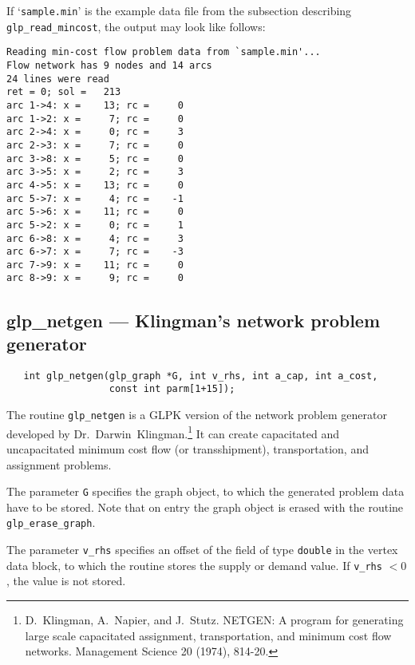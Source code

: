 \documentclass[11pt]{report}
\def\para#1{\noindent{\bf#1}}
\def\synopsis{\para{Synopsis}}
\def\description{\para{Description}}
\begin{document}
If `\verb|sample.min|' is the example data file from the subsection
describing \verb|glp_read_mincost|, the output may look like follows:

\begin{footnotesize}
\begin{verbatim}
Reading min-cost flow problem data from `sample.min'...
Flow network has 9 nodes and 14 arcs
24 lines were read
ret = 0; sol =   213
arc 1->4: x =    13; rc =     0
arc 1->2: x =     7; rc =     0
arc 2->4: x =     0; rc =     3
arc 2->3: x =     7; rc =     0
arc 3->8: x =     5; rc =     0
arc 3->5: x =     2; rc =     3
arc 4->5: x =    13; rc =     0
arc 5->7: x =     4; rc =    -1
arc 5->6: x =    11; rc =     0
arc 5->2: x =     0; rc =     1
arc 6->8: x =     4; rc =     3
arc 6->7: x =     7; rc =    -3
arc 7->9: x =    11; rc =     0
arc 8->9: x =     9; rc =     0
\end{verbatim}
\end{footnotesize}

\subsection{glp\_netgen --- Klingman's network problem generator}

\synopsis

\begin{verbatim}
   int glp_netgen(glp_graph *G, int v_rhs, int a_cap, int a_cost,
                  const int parm[1+15]);
\end{verbatim}

\description

The routine \verb|glp_netgen| is a GLPK version of the network problem
generator developed by Dr.~Darwin~Klingman.\footnote{D.~Klingman,
A.~Napier, and J.~Stutz. NETGEN: A program for generating large scale
capacitated assignment, transportation, and minimum cost flow networks.
Management Science 20 (1974), 814-20.} It can create capacitated and
uncapacitated minimum cost flow (or transshipment), transportation, and
assignment problems.

The parameter \verb|G| specifies the graph object, to which the
generated  problem data have to be stored. Note that on entry the graph
object  is erased with the routine \verb|glp_erase_graph|.

\newpage

The parameter \verb|v_rhs| specifies an offset of the field of type
\verb|double| in the vertex data block, to which the routine stores the
supply or  demand value. If \verb|v_rhs| $<0$, the value is not stored.
\end{document}
